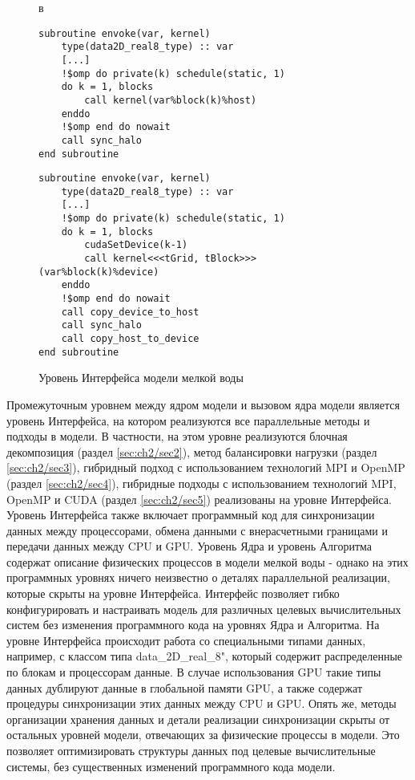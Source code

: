 \begin{figure}[!ht]
	\begin{minipage}{\linewidth}в
		\centering
		\begin{lstlisting}
subroutine envoke(var, kernel)
	type(data2D_real8_type) :: var
	[...]
	!$omp do private(k) schedule(static, 1)
	do k = 1, blocks
		call kernel(var%block(k)%host)
	enddo
	!$omp end do nowait
	call sync_halo
end subroutine
		\end{lstlisting}
	\end{minipage}
	\begin{minipage}{\linewidth}
		\centering
		\begin{lstlisting}
subroutine envoke(var, kernel)
	type(data2D_real8_type) :: var
	[...]
	!$omp do private(k) schedule(static, 1)
	do k = 1, blocks
		cudaSetDevice(k-1)
		call kernel<<<tGrid, tBlock>>> (var%block(k)%device)
	enddo
	!$omp end do nowait
	call copy_device_to_host	
	call sync_halo
	call copy_host_to_device
end subroutine
		\end{lstlisting}
	\end{minipage}
	\vspace{3pt}
	\caption{Уровень Интерфейса модели мелкой воды}
	\label{fig:interface}
\end{figure}

Промежуточным уровнем между ядром модели и вызовом ядра модели является уровень Интерфейса, на котором реализуются все параллельные методы и подходы в модели.
В частности, на этом уровне реализуются блочная декомпозиция (раздел \ref{sec:ch2/sec2}), метод балансировки нагрузки (раздел \ref{sec:ch2/sec3}), гибридный подход с использованием технологий MPI и OpenMP (раздел \ref{sec:ch2/sec4}), гибридные подходы с использованием технологий MPI, OpenMP и CUDA (раздел \ref{sec:ch2/sec5}) реализованы на уровне Интерфейса.
Уровень Интерфейса также включает программный код для синхронизации данных между процессорами, обмена данными с внерасчетными границами и передачи данных между CPU и GPU. Уровень Ядра и уровень Алгоритма содержат описание физических процессов в модели мелкой воды - однако на этих программных уровнях ничего неизвестно о деталях параллельной реализации, которые скрыты на уровне Интерфейса. Интерфейс позволяет гибко конфигурировать и настраивать модель для различных целевых вычислительных систем без изменения программного кода на уровнях Ядра и Алгоритма.
На уровне Интерфейса происходит работа со специальными типами данных, например, с классом типа data\_2D\_real\_8", который содержит распределенные по блокам и процессорам данные. В случае использования GPU такие типы данных дублируют данные в глобальной памяти GPU, а также содержат процедуры синхронизации этих данных между CPU и GPU.
Опять же, методы организации хранения данных и детали реализации синхронизации скрыты от остальных уровней модели, отвечающих за физические процессы в модели. Это позволяет оптимизировать структуры данных под целевые вычислительные системы, без существенных изменений программного кода модели.


